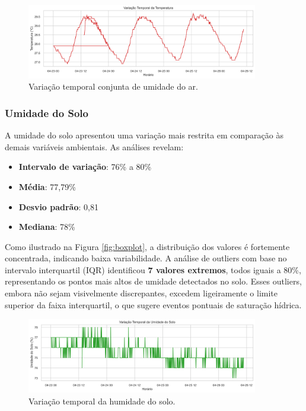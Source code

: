 \documentclass[12pt, a4paper]{article}
\begin{document}
\begin{figure}[H]
\centering
\includegraphics[width=0.9\textwidth]{graficos/temporal_temp.png}
\caption{Variação temporal conjunta de umidade do ar.}
\label{fig:temporal_temp}
\end{figure}

\subsubsection{Umidade do Solo}

A umidade do solo apresentou uma variação mais restrita em comparação às demais variáveis ambientais. As análises revelam:

\begin{itemize}
    \item \textbf{Intervalo de variação}: 76\% a 80\%
    \item \textbf{Média}: 77{,}79\%
    \item \textbf{Desvio padrão}: 0{,}81
    \item \textbf{Mediana}: 78\%
\end{itemize}

Como ilustrado na Figura \ref{fig:boxplot}, a distribuição dos valores é fortemente concentrada, indicando baixa variabilidade. A análise de outliers com base no intervalo interquartil (IQR) identificou \textbf{7 valores extremos}, todos iguais a 80\%, representando os pontos mais altos de umidade detectados no solo. Esses outliers, embora não sejam visivelmente discrepantes, excedem ligeiramente o limite superior da faixa interquartil, o que sugere eventos pontuais de saturação hídrica.

\begin{figure}[H]
\centering
\includegraphics[width=0.9\textwidth]{graficos/temporal_usolo.png}
\caption{Variação temporal da humidade do solo.}
\label{fig:temporal_usolo}
\end{figure}
\end{document}
